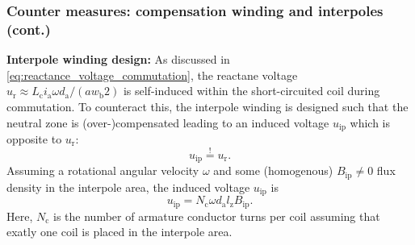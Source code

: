 \begin{frame}
	\frametitle{Counter measures: compensation winding and interpoles (cont.)}
   \textbf{Interpole winding design:}
   As discussed in \eqref{eq:reactance_voltage_commutation}, the reactane voltage $u_\mathrm{r} \approx  L_\mathrm{c} i_\mathrm{a} \omega d_\mathrm{a} / (a w_\mathrm{b}2)$ is self-induced within the short-circuited coil during commutation. To counteract this, the interpole winding is designed such that the neutral zone is (over-)compensated leading to an induced voltage $u_\mathrm{ip}$ which is opposite to $u_\mathrm{r}$:
   \begin{equation}
	   u_\mathrm{ip} \stackrel{!}{=} u_\mathrm{r}.
	   \label{eq:Interpole_voltage_condition}
	\end{equation} \pause
	Assuming a rotational angular velocity $\omega$ and some (homogenous) $B_\mathrm{ip}\neq 0$ flux density in the interpole area, the induced voltage $u_\mathrm{ip}$ is
	\begin{equation}
		u_\mathrm{ip} =  N_\mathrm{c} \omega d_\mathrm{a} l_\mathrm{z} B_\mathrm{ip}.
		\label{eq:Induced_voltage_interpole}
	 \end{equation} 
	 Here, $N_\mathrm{c}$ is the number of armature conductor turns per coil assuming that exatly one coil is placed in the interpole area. 
\end{frame}

